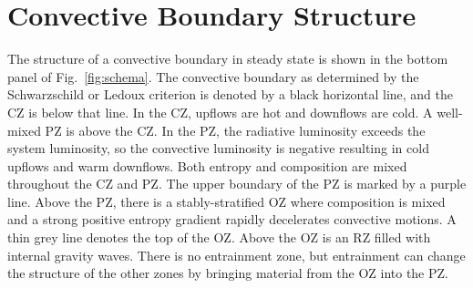\section{Convective Boundary Structure}
\label{sec:structure}
The structure of a convective boundary in steady state is shown in the bottom panel of Fig.~\ref{fig:schema}.
The convective boundary as determined by the Schwarzschild or Ledoux criterion is denoted by a black horizontal line, and the CZ is below that line.
In the CZ, upflows are hot and downflows are cold.
A well-mixed PZ is above the CZ.
In the PZ, the radiative luminosity exceeds the system luminosity, so the convective luminosity is negative resulting in cold upflows and warm downflows.
Both entropy and composition are mixed throughout the CZ and PZ.
The upper boundary of the PZ is marked by a purple line.
Above the PZ, there is a stably-stratified OZ where composition is mixed and a strong positive entropy gradient rapidly decelerates convective motions.
A thin grey line denotes the top of the OZ.
Above the OZ is an RZ filled with internal gravity waves.
There is no entrainment zone, but entrainment can change the structure of the other zones by bringing material from the OZ into the PZ.
